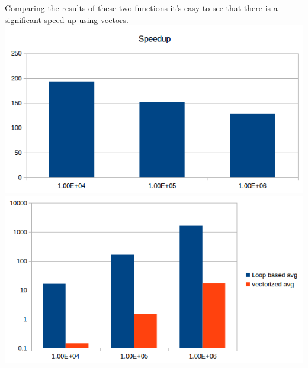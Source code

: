 \documentclass{Article}
\begin{document}
Comparing the results of these two functions it's easy to see that there is a significant speed up using vectors. 
\includegraphics[scale=0.5]{speedup}\includegraphics[scale=0.5]{runtime}
\end{document}
